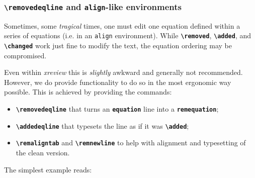 \documentclass[a4paper]{ltxdoc}
\newcommand{\writecommand}[1]{\texttt{\textbf{{\textbackslash#1}}}}
\newcommand{\writeenv}[1]{\texttt{\textbf{{#1}}}}
\begin{document}
\subsubsection{\writecommand{removedeqline} and \texttt{align}-like environments}

Sometimes, some \textit{tragical} times, one must edit one equation defined within a series of equations (i.e. in an \texttt{align} environment).
While \writecommand{removed}, \writecommand{added}, and \writecommand{changed} work just fine to modify the text, the equation ordering may be compromised.

Even within \textit{xreview} this is \textit{slightly} awkward and generally not recommended. However, we do provide functionality to do so in the most ergonomic way possible. This is achieved by providing the commands:
\begin{itemize}
    \item \writecommand{removedeqline} that turns an \writeenv{equation} line into a \writeenv{remequation};
    \item \writecommand{addedeqline} that typesets the line as if it was \writecommand{added};
    \item \writecommand{remaligntab} and \writecommand{remnewline} to help with alignment and typesetting of the clean version.
\end{itemize}

The simplest example reads:
\end{document}
